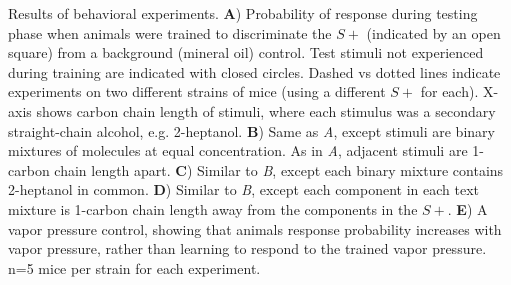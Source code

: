 \label{fig:results}
Results of behavioral experiments. \textbf{A}) Probability of response during testing phase when animals were trained to discriminate the $S+$ (indicated by an open square) from a background (mineral oil) control.  Test stimuli not experienced during training are indicated with closed circles.  Dashed vs dotted lines indicate experiments on two different strains of mice (using a different $S+$ for each).  X-axis shows carbon chain length of stimuli, where each stimulus was a secondary straight-chain alcohol, e.g. 2-heptanol.  \textbf{B}) Same as \textit{A}, except stimuli are binary mixtures of molecules at equal concentration.  As in \textit{A}, adjacent stimuli are 1-carbon chain length apart. \textbf{C}) Similar to \textit{B}, except each binary mixture contains 2-heptanol in common. \textbf{D}) Similar to \textit{B}, except each component in each text mixture is 1-carbon chain length away from the components in the $S+$. \textbf{E}) A vapor pressure control, showing that animals response probability increases with vapor pressure, rather than learning to respond to the trained vapor pressure.  n=5 mice per strain for each experiment.  
